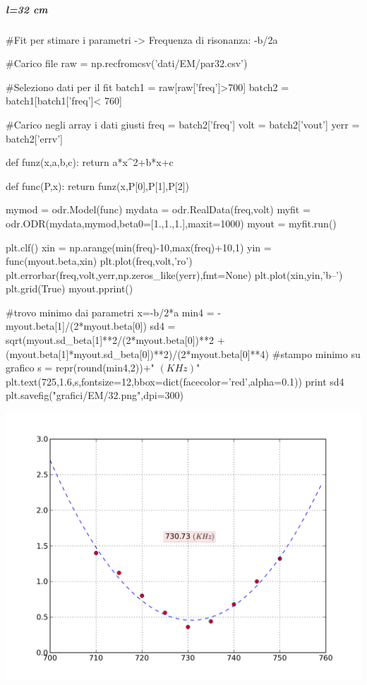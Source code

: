 \subparagraph*{l=32 cm}

\begin{sagesilent}
 #Fit per stimare i parametri -> Frequenza di risonanza: -b/2a

#Carico file
raw = np.recfromcsv('dati/EM/par32.csv')

#Seleziono dati per il fit
batch1 = raw[raw['freq']>700]
batch2 = batch1[batch1['freq']< 760]

#Carico negli array i dati giusti
freq = batch2['freq']
volt = batch2['vout']
yerr = batch2['errv']


def funz(x,a,b,c):
    return a*x^2+b*x+c

def func(P,x):
    return funz(x,P[0],P[1],P[2])

mymod = odr.Model(func)
mydata = odr.RealData(freq,volt)
myfit = odr.ODR(mydata,mymod,beta0=[1.,1.,1.],maxit=1000)
myout = myfit.run()

plt.clf()
xin = np.arange(min(freq)-10,max(freq)+10,1)
yin = func(myout.beta,xin)
plt.plot(freq,volt,'ro')
plt.errorbar(freq,volt,yerr,np.zeros_like(yerr),fmt=None)
plt.plot(xin,yin,'b--')
plt.grid(True)
myout.pprint()

#trovo minimo dai parametri x=-b/2*a
min4 = -myout.beta[1]/(2*myout.beta[0]) 
sd4 = sqrt(myout.sd_beta[1]**2/(2*myout.beta[0])**2 +(myout.beta[1]*myout.sd_beta[0])**2)/(2*myout.beta[0]**4)
#stampo minimo su grafico
s = repr(round(min4,2))+" $(KHz)$"
plt.text(725,1.6,s,fontsize=12,bbox=dict(facecolor='red',alpha=0.1))
print sd4
plt.savefig("grafici/EM/32.png",dpi=300)
\end{sagesilent}

\includegraphics[scale=0.75]{grafici/EM/32.png}

